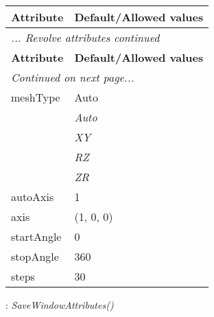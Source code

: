 \documentclass[10pt,a4paper]{report}
\begin{document}
\begin{longtable}{ll}
{\bf Attribute} & {\bf Default/Allowed values} \\
\hline \hline
\endfirsthead
\multicolumn{2}{l}{{\it ... Revolve attributes continued}} \\
{\bf Attribute} & {\bf Default/Allowed values} \\
\hline \hline
\endhead
\hline
\multicolumn{2}{l}{{\it Continued on next page...}} \\
\endfoot
\hline
\endlastfoot

meshType  &  Auto   \\
 & {\it  Auto} \\
 & {\it  XY} \\
 & {\it  RZ} \\
 & {\it  ZR} \\
autoAxis  &  1 \\
axis  &  (1, 0, 0) \\
startAngle  &  0 \\
stopAngle  &  360 \\
steps  &  30 \\
\end{longtable}

\newpage

{}
: {\it SaveWindowAttributes() }\\[-3mm]
\end{document}
